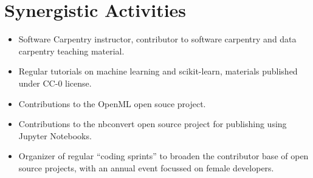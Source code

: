 \documentclass[11pt,letterpaper]{article}
\begin{document}
\section*{Synergistic Activities}
\begin{itemize}
\item Software Carpentry instructor, contributor to software carpentry and data
    carpentry teaching material.
\item Regular tutorials on machine learning and scikit-learn, materials published under CC-0 license.
\item Contributions to the OpenML open souce project.
\item Contributions to the nbconvert open source project for publishing using Jupyter Notebooks.
\item Organizer of regular ``coding sprints'' to broaden the contributor base of open source projects, with an annual event focussed on female developers.
\end{itemize}
\end{document}
